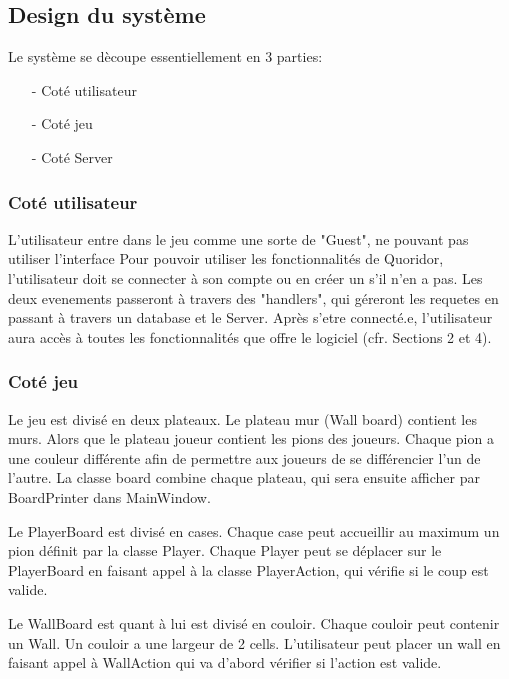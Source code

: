 \subsection{Design du système}
    Le système se dècoupe essentiellement en 3 parties:
    \begin{itemize}
        \item[-] Coté utilisateur
        \item[-] Coté jeu
        \item[-] Coté Server   
    \end{itemize}
    \subsubsection{Coté utilisateur}
        L'utilisateur entre dans le jeu comme une sorte de "Guest",
        ne pouvant pas utiliser l'interface
        Pour pouvoir utiliser les fonctionnalités de Quoridor, l'utilisateur doit se connecter
        à son compte ou en créer un s'il n'en a pas. Les deux evenements passeront à travers des "handlers", qui
        géreront les requetes en passant à travers un database et le Server. Après s'etre connecté.e, l'utilisateur aura accès à toutes les fonctionnalités
        que offre le logiciel (cfr. Sections 2 et 4).
    \subsubsection{Coté jeu}
        Le jeu est divisé en deux plateaux. Le plateau mur (Wall board) contient les murs. Alors que le plateau joueur contient les pions des joueurs. Chaque pion a une couleur différente afin de permettre aux joueurs de se différencier l'un de l'autre. La classe board combine chaque plateau, qui sera ensuite afficher par BoardPrinter dans MainWindow. 
        
        Le PlayerBoard est divisé en cases. Chaque case peut accueillir au maximum un pion définit par la classe Player. Chaque Player peut se déplacer sur le PlayerBoard en faisant appel à la classe PlayerAction, qui vérifie si le coup est valide.
        
        Le WallBoard est quant à lui est divisé en couloir. Chaque couloir peut contenir un Wall. Un couloir a une largeur de 2 cells.
        L'utilisateur peut placer un wall en faisant appel à WallAction qui va d'abord vérifier si l'action est valide.
    

